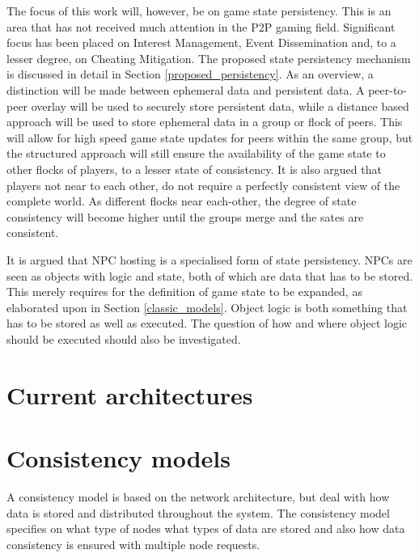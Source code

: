 \documentclass[journal,oneside,a4paper,onecolumn]{IEEEtran}
\begin{document}
The focus of this work will, however, be on game state persistency. This is an area that has not received much attention in the P2P gaming field. Significant focus has been placed on Interest Management, Event Dissemination and, to a lesser degree, on Cheating Mitigation. The proposed state persistency mechanism is discussed in detail in Section \ref{proposed_persistency}. As an overview, a distinction will be made between ephemeral data and persistent data. A peer-to-peer overlay will be used to securely store persistent data, while a distance based approach will be used to store ephemeral data in a group or flock of peers. This will allow for high speed game state updates for peers within the same group, but the structured approach will still ensure the availability of the game state to other flocks of players, to a lesser state of consistency. It is also argued that players not near to each other, do not require a perfectly consistent view of the complete world. As different flocks near each-other, the degree of state consistency will become higher until the groups merge and the sates are consistent.

It is argued that NPC hosting is a specialised form of state persistency. NPCs are seen as objects with logic and state, both of which are data that has to be stored. This merely requires for the definition of game state to be expanded, as elaborated upon in Section \ref{classic_models}. Object logic is both something that has to be stored as well as executed. The question of how and where object logic should be executed should also be investigated.

\section{Current architectures}
\label{current_architectures}



\section{Consistency models}
\label{consistency_models}

A consistency model is based on the network architecture, but deal with how data is stored and distributed throughout the system. The consistency model specifies on what type of nodes what types of data are stored and also how data consistency is ensured with multiple node requests.
\end{document}
